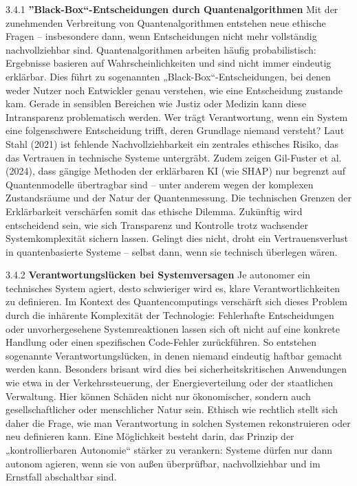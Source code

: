 3.4.1 \textbf{”Black-Box“-Entscheidungen durch Quantenalgorithmen}
Mit der zunehmenden Verbreitung von Quantenalgorithmen entstehen neue ethische Fragen – insbesondere dann, wenn Entscheidungen nicht mehr vollständig nachvollziehbar sind. Quantenalgorithmen arbeiten häufig probabilistisch: Ergebnisse basieren auf Wahrscheinlichkeiten und sind nicht immer eindeutig erklärbar. Dies führt zu sogenannten „Black-Box“-Entscheidungen, bei denen weder Nutzer noch Entwickler genau verstehen, wie eine Entscheidung zustande kam.
Gerade in sensiblen Bereichen wie Justiz oder Medizin kann diese Intransparenz problematisch werden. Wer trägt Verantwortung, wenn ein System eine folgenschwere Entscheidung trifft, deren Grundlage niemand versteht? Laut Stahl (2021) ist fehlende Nachvollziehbarkeit ein zentrales ethisches Risiko, das das Vertrauen in technische Systeme untergräbt.\cite{stahl_artificial_2021}
Zudem zeigen Gil-Fuster et al. (2024), dass gängige Methoden der erklärbaren KI (wie SHAP) nur begrenzt auf Quantenmodelle übertragbar sind – unter anderem wegen der komplexen Zustandsräume und der Natur der Quantenmessung. Die technischen Grenzen der Erklärbarkeit verschärfen somit das ethische Dilemma.\cite{gil-fuster_opportunities_2024}
Zukünftig wird entscheidend sein, wie sich Transparenz und Kontrolle trotz wachsender Systemkomplexität sichern lassen. Gelingt dies nicht, droht ein Vertrauensverlust in quantenbasierte Systeme – selbst dann, wenn sie technisch überlegen wären.

 

 3.4.2 \textbf{Verantwortungslücken bei Systemversagen}
 Je autonomer ein technisches System agiert, desto schwieriger wird es, klare Verantwortlichkeiten zu definieren. Im Kontext des Quantencomputings verschärft sich dieses Problem durch die inhärente Komplexität der Technologie: Fehlerhafte Entscheidungen oder unvorhergesehene Systemreaktionen lassen sich oft nicht auf eine konkrete Handlung oder einen spezifischen Code-Fehler zurückführen. So entstehen sogenannte Verantwortungslücken, in denen niemand eindeutig haftbar gemacht werden kann.
Besonders brisant wird dies bei sicherheitskritischen Anwendungen wie etwa in der Verkehrssteuerung, der Energieverteilung oder der staatlichen Verwaltung. Hier können Schäden nicht nur ökonomischer, sondern auch gesellschaftlicher oder menschlicher Natur sein. Ethisch wie rechtlich stellt sich daher die Frage, wie man Verantwortung in solchen Systemen rekonstruieren oder neu definieren kann. Eine Möglichkeit besteht darin, das Prinzip der „kontrollierbaren Autonomie“ stärker zu verankern: Systeme dürfen nur dann autonom agieren, wenn sie von außen überprüfbar, nachvollziehbar und im Ernstfall abschaltbar sind.\cite{floridi_ai4peopleethical_2018}
 
